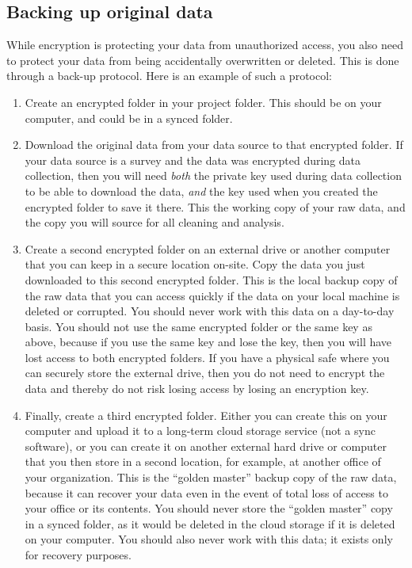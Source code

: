 \subsection{Backing up original data}

While encryption is protecting your data from unauthorized access,
you also need to protect your data
from being accidentally overwritten or deleted.
This is done through a back-up protocol.
Here is an example of such a protocol:

\begin{enumerate}
	\item Create an encrypted folder in your project folder.
	This should be on your computer, and could be in a synced folder.

	\item Download the original data from your data source to that encrypted folder.
	If your data source is a survey and the data was encrypted during data collection,
	then you will need \textit{both} the
	private key used during data collection to be able to download the data,
	\textit{and} the key used when you created the encrypted folder to save it there.
	This the working copy of your raw data, and the copy you will source for all cleaning and analysis.

	\item Create a second encrypted folder on an external drive or another computer that you can keep in a secure location on-site.
	Copy the data you just downloaded to this second encrypted folder.
	This is the local backup copy of the raw data
	that you can access quickly if the data on your local machine is deleted or corrupted.
	You should never work with this data on a day-to-day basis.
	You should not use the same encrypted folder or the same key as above,
	because if you use the same key and lose the key,
	then you will have lost access to both encrypted folders.
	If you have a physical safe where you can securely store the external drive,
	then you do not need to encrypt the data
	and thereby do not risk losing access by losing an encryption key.

	\item Finally, create a third encrypted folder.
	Either you can create this on your computer and upload it to a long-term cloud storage service (not a sync software),
	or you can create it on	another external hard drive or computer that you then store in a second location,
	for example, at another office of your organization.
	This is the ``golden master'' backup copy of the raw data,
	because it can recover your data even in the event of
	total loss of access to your office or its contents.
	You should never store the ``golden master'' copy in a synced folder,
	as it would be deleted in the cloud storage if it is deleted on your computer.
	You should also never work with this data;
	it exists only for recovery purposes.
\end{enumerate}

